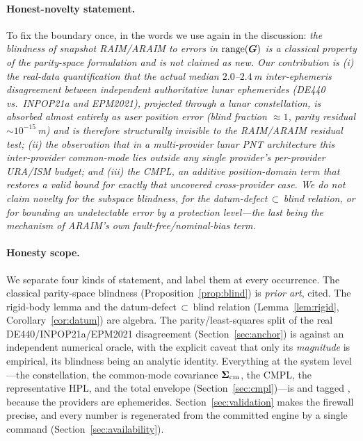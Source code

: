 \paragraph{Honest-novelty statement.}
To fix the boundary once, in the words we use again in the discussion: \emph{the
blindness of snapshot RAIM/ARAIM to errors in $\operatorname{range}(\bm{G})$ is a classical property of
the parity-space formulation and is not claimed as new. Our contribution is (i) the
real-data quantification that the actual median $2.0$--$2.4\,$m inter-ephemeris
disagreement between independent authoritative lunar ephemerides (DE440 vs.\ INPOP21a
and EPM2021), projected through a lunar constellation, is absorbed almost entirely as
user position error (blind fraction $\approx1$, parity residual $\sim\!10^{-15}\,$m)
and is therefore structurally invisible to the RAIM/ARAIM residual test; (ii) the
observation that in a multi-provider lunar PNT architecture this inter-provider
common-mode lies outside any single provider's per-provider URA/ISM budget; and (iii)
the CMPL, an additive position-domain term that restores a valid bound for exactly that
uncovered cross-provider case. We do not claim novelty for the subspace blindness, for
the datum-defect$\,\subset\,$blind relation, or for bounding an undetectable error by a
protection level---the last being the mechanism of ARAIM's own fault-free/nominal-bias
term.}

\paragraph{Honesty scope.}
We separate four kinds of statement, and label them at every occurrence. The classical
parity-space blindness (Proposition~\ref{prop:blind}) is \emph{prior art}, cited. The
rigid-body lemma and the datum-defect$\,\subset\,$blind relation
(Lemma~\ref{lem:rigid}, Corollary~\ref{cor:datum}) are \Proven{} algebra. The
parity/least-squares split of the real DE440/INPOP21a/EPM2021 disagreement
(Section~\ref{sec:anchor}) is \Validated{} against an independent numerical oracle, with
the explicit caveat that only its \emph{magnitude} is empirical, its blindness being an
analytic identity. Everything at the system level---the constellation, the common-mode
covariance $\bm{\Sigma}_{\mathrm{cm}}$, the CMPL, the representative HPL, and the total
envelope (Section~\ref{sec:cmpl})---is \Modelled{} and tagged \modtag{}, because the
providers are ephemerides. Section~\ref{sec:validation} makes the firewall precise, and
every number is regenerated from the committed engine by a single command
(Section~\ref{sec:availability}).
